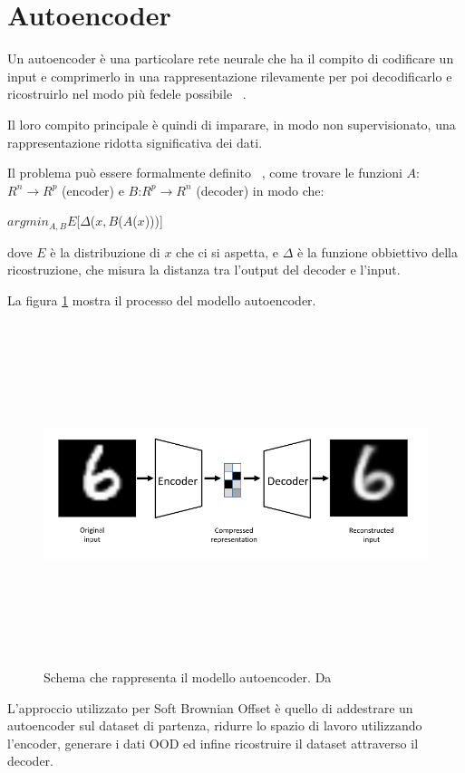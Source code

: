 \section{Autoencoder} 

Un autoencoder è una particolare rete neurale che ha il compito di codificare un input e comprimerlo in una rappresentazione rilevamente per poi decodificarlo e ricostruirlo nel modo più fedele possibile ~\cite{bankAutoencoders2021}.

Il loro compito principale è quindi di imparare, in modo non supervisionato, una rappresentazione ridotta significativa dei dati.

Il problema può essere formalmente definito ~\cite{baldiAutoencodersUnsupervisedLearning}, come trovare le funzioni $A$:$ R^{n} \rightarrow R^p$ (encoder) e $B$:$ R^{p} \rightarrow R^n$ (decoder) in modo che:

\begin{center}
$arg min_{A,B} E$[$\Delta$($x,  B$($A$($x$)))] \\
\end{center}

dove $E$ è la distribuzione di $x$ che ci si aspetta, e $\Delta$ è la funzione obbiettivo della ricostruzione, che misura la distanza tra l'output del decoder e l'input.

La figura \ref{fig:ae_schema} mostra il processo del modello autoencoder.

\begin{figure}[htpb]
    \centering
    \includegraphics[width=\textwidth,height=10cm,keepaspectratio=true]{img/ae_schema.png}
    \caption{
        Schema che rappresenta il modello autoencoder. Da ~\cite{baldiAutoencodersUnsupervisedLearning}
    }
    \label{fig:ae_schema}
\end{figure}


L'approccio utilizzato per Soft Brownian Offset è quello di addestrare un autoencoder sul dataset di partenza, ridurre lo spazio di lavoro utilizzando l'encoder, generare i dati OOD ed infine ricostruire il dataset attraverso il decoder.


